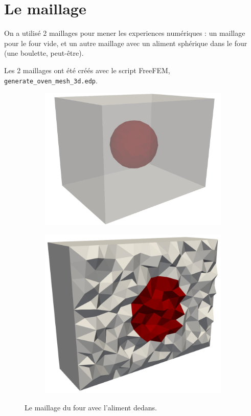 \section{Le maillage}

On a utilisé 2 maillages pour mener les experiences numériques : un maillage
pour le four vide, et un autre maillage avec un aliment sphérique
dans le four (une boulette, peut-être).

Les 2 maillages ont été créés avec le script FreeFEM,
\verb|generate_oven_mesh_3d.edp|.

\begin{figure}[H]
    \centering
    \begin{subfigure}{.5\textwidth}
        \centering
        \includegraphics[scale=0.20]{figures/maillage/maillage1.png}
    \end{subfigure}%
    \begin{subfigure}{.5\textwidth}
        \centering
        \includegraphics[scale=0.20]{figures/maillage/maillage2.png}
    \end{subfigure}
    \caption{Le maillage du four avec l'aliment dedans.}
\end{figure}
